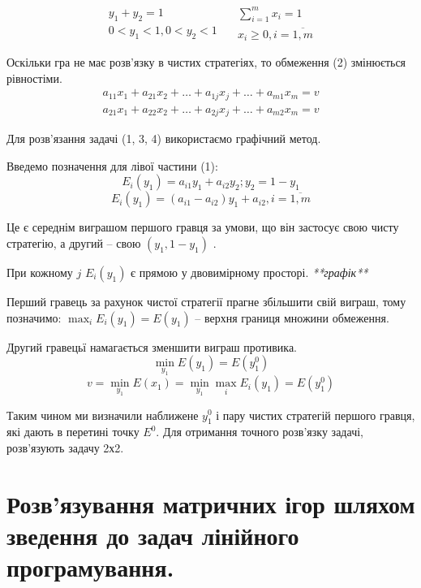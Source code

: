 \documentclass[12pt,a4paper]{book}
\begin{document}
\begin{equation}
\begin{array}{c}
y_1+y_2=1\\
0<y_1<1, 0<y_2<1
\end{array}
\quad
\begin{array}{c}
\sum_{i=1}^m x_i=1\\
x_i \ge 0, i=\overline{1,m}
\end{array}
\end{equation}

Оскільки гра не має розв'язку в чистих стратегіях, то обмеження (2) змінюється рівностіми.
\begin{equation}
\begin{array}{l}
a_{11}x_1+a_{21}x_2+\dots+a_{1j}x_j+\dots+a_{m1}x_m = v\\
a_{21}x_1+a_{22}x_2+\dots+a_{2j}x_j+\dots+a_{m2}x_m = v
\end{array}
\end{equation}

Для розв'язання задачі (1, 3, 4) використаємо графічний метод.

Введемо позначення для лівої частини (1):
\[E_i(y_1) = a_{i1}y_1+a_{i2}y_2; y_2=1-y_1\]
\begin{equation}
E_i(y_1)=(a_{i1}-a_{i2})y_1+a_{i2}, i=\overline{1,m}
\end{equation}

Це є середнім виграшом першого гравця за умови, що він застосує свою чисту стратегію, а другий -- свою $(y_1,1-y_1)$ .

При кожному $j$ $E_i(y_1)$ є прямою у двовимірному просторі.
\emph{**графік**}

Перший гравець за рахунок чистої стратегії прагне збільшити свій виграш, тому позначимо:
$\displaystyle \max_iE_i(y_1)=E(y_1)$ -- верхня границя множини обмеження.

Другий гравецьї намагається зменшити виграш противика.
\[\min_{y_1} E(y_1) = E(y_1^0)\]
\[v=\min_{y_1} E(x_1)=\min_{y_1} \max_iE_i(y_1)=E(y_1^0)\]

Таким чином ми визначили наближене $y_1^0$ і пару чистих стратегій першого гравця, які дають в перетині точку $E^0$. Для отримання точного розв'язку задачі, розв'язують задачу 2х2. 

\section{Розв'язування матричних ігор шляхом зведення до задач лінійного програмування.}
\end{document}
